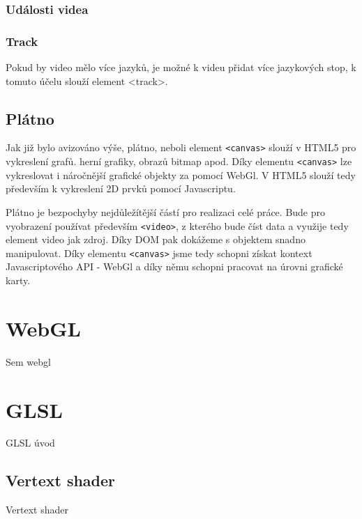 \subsubsection{Události videa}




\subsubsection{Track}
Pokud by video  mělo více jazyků, je možné k videu přidat více jazykových stop, k tomuto účelu slouží element <track>.

\newpage

\subsection{Plátno}
Jak již bylo avizováno výše, plátno, neboli element \texttt{<canvas>} slouží v HTML5 pro vykreslení grafů. herní grafiky, obrazů bitmap apod. Díky elementu \texttt{<canvas>} lze vykreslovat i náročnější grafické objekty za pomocí WebGl. V HTML5 slouží tedy především k vykreslení 2D prvků pomocí Javascriptu.

Plátno je bezpochyby nejdůležítější částí pro realizaci celé práce. Bude pro vyobrazení používat především \texttt{<video>}, z kterého bude číst data a využije tedy element video jak zdroj. Díky DOM pak dokážeme s objektem snadno manipulovat. Díky elementu \texttt{<canvas>} jsme tedy schopni získat kontext Javascriptového API - WebGl a díky němu schopni pracovat na úrovni grafické karty.

\newpage

\section{WebGL}
Sem webgl


\newpage

\section{GLSL}
GLSL úvod

\subsection{Vertext shader}
Vertext shader

